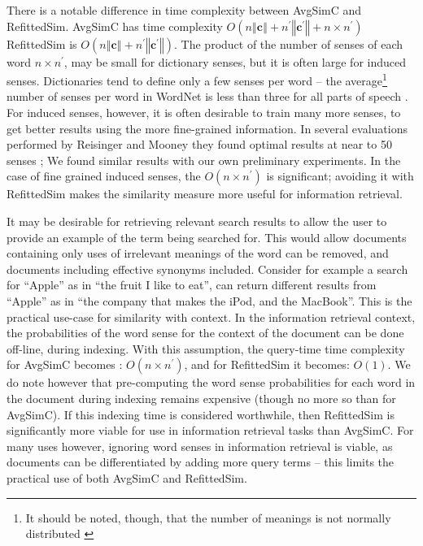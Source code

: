 \documentclass{sig-alternate}
\renewcommand{\c}{\mathbf{c}}
\begin{document}
There is a notable difference in time complexity between AvgSimC and RefittedSim.
AvgSimC has time complexity $O(n\left\Vert \c\right\Vert +n^{\prime}\left\Vert \c^{\prime}\right\Vert +n\times n^{\prime})$
RefittedSim is $O(n\left\Vert \c\right\Vert +n^{\prime}\left\Vert \c^{\prime}\right\Vert)$.
The product of the number of senses of each word $n \times n^\prime$, may be small for dictionary senses, but it is often large for induced senses. Dictionaries tend to define only a few senses per word -- the average\footnote{It should be noted, though, that the number of meanings is not normally distributed \parencite{zipf1945meaning}} number of senses per word in WordNet is less than three for all parts of speech \parencite{miller1995wordnet}. For induced senses, however, it is often desirable to train many more senses, to get better results using the more fine-grained information. In several evaluations performed by Reisinger and Mooney they found optimal results at near to 50 senses \parencite{Reisinger2010}; We found similar results with our own preliminary experiments. In the case of fine grained induced senses, the $O(n \times n^\prime)$ is significant; avoiding it with RefittedSim makes the similarity measure more useful for information retrieval.

It may be desirable for retrieving relevant search results to allow the user to provide an example of the term being searched for. This would allow documents containing only uses of irrelevant meanings of the word can be removed, and documents including effective synonyms included. Consider for example a search for \enquote{Apple} as in \enquote{the fruit I like to eat}, can return different results from \enquote{Apple} as in \enquote{the company that makes the iPod, and the MacBook}. This is the practical use-case for similarity with context.
In the information retrieval context, the probabilities of the word sense for the context of the document can be done off-line, during indexing. With this assumption, the query-time time complexity for AvgSimC becomes : $O(n\times n^{\prime})$, and for RefittedSim it becomes: $O(1)$.
We do note however that pre-computing the word sense probabilities for each word in the document during indexing remains expensive (though no more so than for AvgSimC). If this indexing time is considered worthwhile, then RefittedSim is significantly more viable for use in information retrieval tasks than AvgSimC. For many uses however, ignoring word senses in information retrieval is viable, as documents can be differentiated by adding more query terms -- this limits the practical use of both AvgSimC and RefittedSim.
\end{document}
